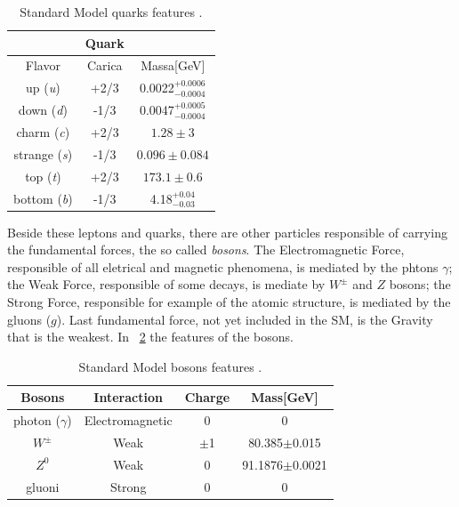 \begin{table}[htbp]	
	\begin{center}
		\begin{tabular}{|ccc|}
			\hline    & \textbf{Quark} &   \\
			\hline   Flavor & Carica & Massa[GeV]  \\
			\hline
			\hline
			up (\emph{u}) & +2/3 & 0.0022$^{+0.0006}_{-0.0004}$ \\   
			down (\emph{d}) & -1/3 & 0.0047$^{+0.0005}_{-0.0004}$ \\
			\hline
			charm (\emph{c}) & +2/3 & $1.28\pm3$ \\
			strange (\emph{s}) & -1/3 & $0.096\pm0.084$ \\
			\hline
			top (\emph{t}) & +2/3 & $173.1\pm0.6$ \\
			bottom (\emph{b}) & -1/3 & 4.18$^{+0.04}_{-0.03}$ \\   
			\hline
			\hline
		\end{tabular}
	\end{center}
	\caption{Standard Model quarks features \cite{PDG}.}
	\label{quarkSM}
\end{table}

Beside these leptons and quarks, there are other particles responsible of carrying the fundamental forces, the so called \textit{bosons}. The Electromagnetic Force, responsible of all eletrical and magnetic phenomena, is mediated by the phtons {$\gamma$}; the Weak Force, responsible of some decays, is mediate by $W^{\pm}$ and $Z$ bosons; the Strong Force, responsible for example of the atomic structure, is mediated by the gluons ($g$). Last fundamental force, not yet included in the SM, is the Gravity that is the weakest. In \tablename~\ref{bosonsSM} the features of the bosons.
\begin{table}[htbp]	
	\begin{center}
		\begin{tabular}{|cccc|}
			\hline    Bosons & Interaction & Charge & Mass[GeV]  \\
			\hline
			\hline
			 photon ($\gamma$) &  Electromagnetic & 0 & 0   \\
			 \hline
			 $W^{\pm}$ & Weak & $\pm$1 & 80.385$\pm$0.015   \\
			 \hline 
             	 	 $Z^{0}$ & Weak & 0 & 91.1876$\pm$0.0021   \\
			 \hline
			 gluoni & Strong & 0 & 0 \\
			\hline
			\hline
		\end{tabular}
	\end{center}
	\caption{Standard Model bosons features \cite{PDG}.}
	\label{bosonsSM}
\end{table}


